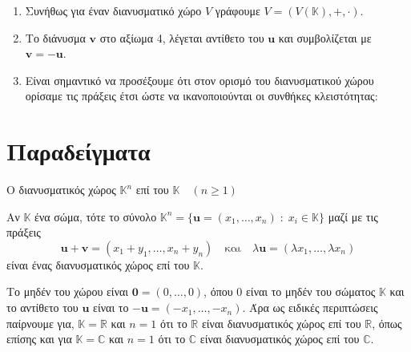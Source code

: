 \begin{rem}
\item {}
  \begin{enumerate}
    \item Συνήθως για έναν διανυσματικό χώρο $V$ γράφουμε 
      $V = (V(\mathbb{K}), +, \cdot) $.
    \item Το διάνυσμα $ \mathbf{v} $ στο αξίωμα 4, λέγεται 
      \textcolor{Col2}{αντίθετο} του $ \mathbf{u} $ και συμβολίζεται με 
      $ \mathbf{v} = - \mathbf{u} $.
    \item Είναι σημαντικό να προσέξουμε ότι στον ορισμό του διανυσματικού χώρου 
      ορίσαμε τις πράξεις έτσι ώστε να ικανοποιούνται οι συνθήκες κλειστότητας:
  \end{enumerate}
\end{rem}


\section{Παραδείγματα}


\begin{example}\label{ex:Rn}
  \textcolor{Col2}{Ο διανυσματικός χώρος $ \mathbb{K}^{n} $ 
  επί του $ \mathbb{K} \quad (n \geq 1) $}

  Αν $ \mathbb{K} $ ένα σώμα, τότε το σύνολο $ \mathbb{K}^{n} = 
  \{ \mathbf{u} = (x_{1},\ldots,x_{n}) \; : \; x_{i} \in \mathbb{K}\} $ 
  μαζί με τις πράξεις 
  \[
    \mathbf{u}+ \mathbf{v} = (x_{1}+ y_{1}, \ldots , x_{n}+y_{n}) 
    \quad \text{και} \quad \lambda \mathbf{u} = 
    ( \lambda x_{1}, \ldots, \lambda x_{n})
  \]
  είναι ένας διανυσματικός χώρος επί του $ \mathbb{K} $. 

  Το μηδέν του χώρου 
  είναι $ \mathbf{0} = (0,\ldots,0) $, όπου $0$ είναι το μηδέν του σώματος 
  $ \mathbb{K} $ και το αντίθετο του $ \mathbf{u} $ είναι το $ - \mathbf{u} =
  (- x_{1}, \ldots, - x_{n}) $.
  Άρα ως ειδικές περιπτώσεις παίρνουμε για, $ \mathbb{K} = \mathbb{R} $ και $ n=1 $ 
  ότι το $ \mathbb{R} $ είναι διανυσματικός χώρος επί του $ \mathbb{R} $, 
  όπως επίσης και για $ \mathbb{K} = \mathbb{C} $ και $ n=1 $ ότι το $ \mathbb{C} $ είναι διανυσματικός χώρος επί του 
  $ \mathbb{C} $.
\end{example} 

